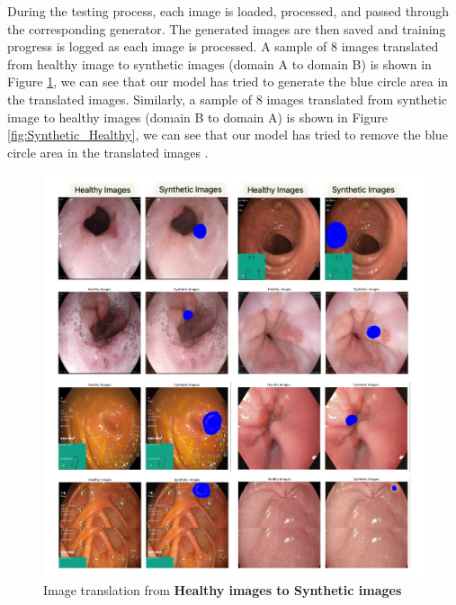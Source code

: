 \documentclass[UKenglish,12pt]{master-style}
\begin{document}
During the testing process, each image is loaded, processed, and passed through the corresponding generator. The generated images are then saved and training progress is logged as each image is processed. A sample of 8 images translated from healthy image to synthetic images (domain A to domain B) is shown in Figure \ref{fig:Healthy_Synthetic}, we can see that our model has tried to generate the blue circle area in the translated images. Similarly, a sample of 8 images translated from synthetic image to healthy images (domain B to domain A) is shown in Figure \ref{fig:Synthetic_Healthy}, we can see that our model has tried to remove the blue circle area in the translated images . 

\begin{figure}[htbp]
    \centering
    \includegraphics[width=1\textwidth]{Images/Healthy_Synthetic.jpeg}
    \caption{Image translation from \textbf{Healthy images to Synthetic images}}
    \label{fig:Healthy_Synthetic}
\end{figure}
\end{document}
